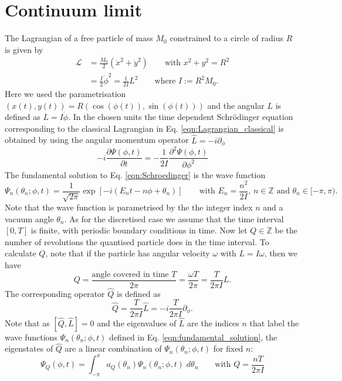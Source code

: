 \documentclass[11pt]{article}
\begin{document}
\section{Continuum limit}
The Lagrangian of a free particle of mass $M_0$ constrained to a circle of radius $R$ is given by
\begin{equation}
\begin{aligned}
  \mathcal{L} &= \frac{M_0}{2}\left(\dot{x}^2+\dot{y}^2\right)\qquad\text{with $x^2+y^2=R^2$}\\
&= \frac{I}{2}\dot{\phi}^2=\frac{1}{2I} L^2 \qquad{\text{where $I:=R^2M_0$}}.
\end{aligned}
\label{eqn:Lagrangian_classical}
\end{equation}
Here we used the parametrisation $(x(t),y(t))=R(\cos(\phi(t)),\sin(\phi(t)))$ and the angular $L$ is defined as $L=I\dot{\phi}$. In the chosen units the time dependent Schr\"{o}dinger equation corresponding to the classical Lagrangian in Eq. \eqref{eqn:Lagrangian_classical} is obtained by using the angular momentum operator $\hat{L}=-i\partial_\phi$
\begin{equation}
  -i\frac{\partial{\Psi(\phi,t)}}{\partial t} = -\frac{1}{2I} \frac{\partial^2\Psi(\phi,t)}{\partial \phi^2}\label{eqn:Schroedinger}
\end{equation}
The fundamental solution to Eq. \eqref{eqn:Schroedinger} is the wave function
\begin{equation}
  \Psi_{n}(\theta_n;\phi,t) = \frac{1}{\sqrt{2\pi}} \exp\left[-i(E_n t-n\phi+\theta_n)\right]
  \qquad\text{with $E_n=\frac{n^2}{2I}$, $n\in\mathbb{Z}$ and $\theta_n\in [-\pi,\pi)$}.\label{eqn:fundamental_solution}
\end{equation}
Note that the wave function is parametrised by the the integer index $n$ and a vacuum angle $\theta_n$. As for the discretised case we assume that the time interval $[0,T]$ is finite, with periodic boundary conditions in time. Now let $Q\in\mathbb{Z}$ be the number of revolutions the quantised particle does in the time interval. To calculate $Q$, note that if the particle has angular velocity $\omega$ with $L=I\omega$, then we have
\begin{equation}
Q = \frac{\text{angle covered in time $T$}}{2\pi} = \frac{\omega T}{2\pi} = \frac{T}{2\pi I}L.
\end{equation}
The corresponding operator $\hat{Q}$ is defined as 
\begin{equation}
\hat{Q} = \frac{T}{2\pi I}\hat{L} = -i\frac{T}{2\pi I}\partial_\phi.
\end{equation}
Note that as $[\hat{Q},\hat{L}]=0$ and the eigenvalues of $\hat{L}$ are the indices $n$ that label the wave functions $\Psi_n(\theta_n;\phi,t)$ defined in Eq. \eqref{eqn:fundamental_solution}, the eigenstates of $\hat{Q}$ are a linear combination of $\Psi_n(\theta_n;\phi,t)$ for fixed $n$:
\begin{equation}
  \Psi_Q(\phi,t) = \int_{-\pi}^{\pi} a_Q(\theta_n)\Psi_n(\theta_n;\phi,t)\;d\theta_n\qquad\text{with $Q=\frac{nT}{2\pi I}$}
\end{equation}


\end{document}

